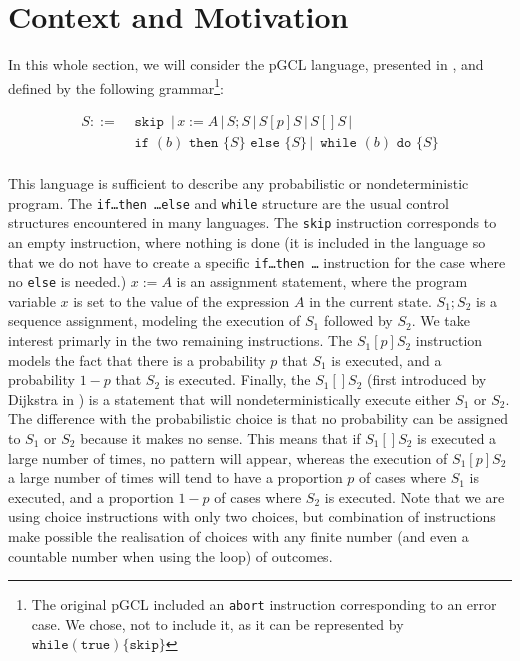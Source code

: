 \documentclass[a4paper,10pt]{llncs}
\begin{document}
\section{Context and Motivation}
\label{sec:context}
In this whole section, we will consider the pGCL language, presented in \cite{McIver05}, and defined by the following grammar\footnote{The original pGCL included an \texttt{abort} instruction corresponding to an error case. We chose, not to include it, as it can be represented by $\texttt{while} (\texttt{true})\{ \texttt{skip} \}$}:

\begin{align*}
 S ::= & \texttt{ skip } \,|\, x := A \,|\, S;S \,|\, S [p] S \,|\, S [\!] S \,|\ \\
 & \texttt{ if } (b) \texttt{ then } \{ S \} \texttt{ else } \{ S \} \,|\, \texttt{ while }(b) \texttt{ do }\{S\} \\
\end{align*}

This language is sufficient to describe any probabilistic or nondeterministic program. The \texttt{if\dots then \dots else} and \texttt{while} structure are the usual control structures encountered in many languages. The \texttt{skip} instruction corresponds to an empty instruction, where nothing is done (it is included in the language so that we do not have to create a specific \texttt{if\dots then \dots} instruction for the case where no \texttt{else} is needed.) $x := A$ is an assignment statement, where the program variable $x$ is set to the value of the expression $A$ in the current state. $S_1 ; S_2$ is a sequence assignment, modeling the execution of $S_1$ followed by $S_2$. We take interest primarly in the two remaining instructions.\newline
The $S_1 [p] S_2$ instruction models the fact that there is a probability $p$ that $S_1$ is executed, and a probability $1-p$ that $S_2$ is executed. Finally, the $S_1 [\!] S_2 $ (first introduced by Dijkstra in \cite{Dijkstra76}) is a statement that will nondeterministically execute either $S_1$ or $S_2$. The difference with the probabilistic choice is that no probability can be assigned to $S_1$ or $S_2$ because it makes no sense. This means that if $S_1 [\!] S_2 $ is executed a large number of times, no pattern will appear, whereas the execution of $S_1 [p] S_2$ a large number of times will tend to have a proportion $p$ of cases where $S_1$ is executed, and a proportion $1-p$ of cases where $S_2$ is executed.\newline
Note that we are using choice instructions with only two choices, but combination of instructions make possible the realisation of choices with any finite number (and even a countable number when using the loop) of outcomes.\newline
\end{document}
